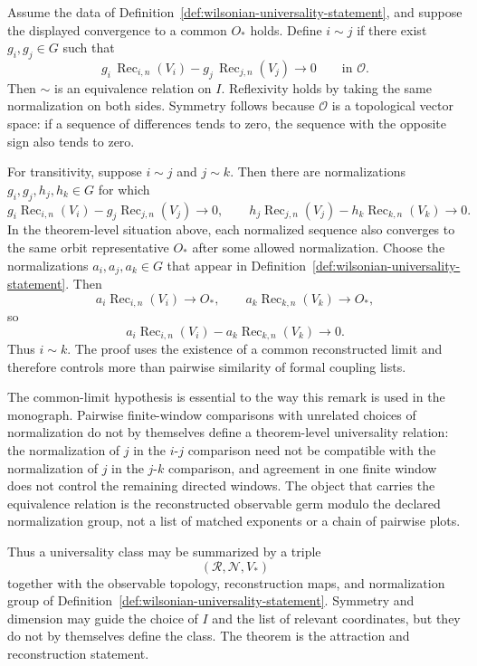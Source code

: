 \begin{remark}
\label{rem:universality-equivalence-relation}
Assume the data of Definition~\ref{def:wilsonian-universality-statement}, and
suppose the displayed convergence to a common \(O_\ast\) holds.  Define
\(i\sim j\) if there exist \(g_i,g_j\in G\) such that
\[
  g_i\,\operatorname{Rec}_{i,n}(V_i)
  -
  g_j\,\operatorname{Rec}_{j,n}(V_j)
  \longrightarrow0
  \qquad\text{in }\mathcal O .
\]
Then \(\sim\) is an equivalence relation on \(I\).
Reflexivity holds by taking the same normalization on both sides.  Symmetry
follows because \(\mathcal O\) is a topological vector space: if a sequence
of differences tends to zero, the sequence with the opposite sign also tends
to zero.

For transitivity, suppose \(i\sim j\) and \(j\sim k\).  Then there are
normalizations \(g_i,g_j,h_j,h_k\in G\) for which
\[
  g_i\operatorname{Rec}_{i,n}(V_i)
  -
  g_j\operatorname{Rec}_{j,n}(V_j)\to0,
  \qquad
  h_j\operatorname{Rec}_{j,n}(V_j)
  -
  h_k\operatorname{Rec}_{k,n}(V_k)\to0 .
\]
In the theorem-level situation above, each normalized sequence also converges
to the same orbit representative \(O_\ast\) after some allowed normalization.
Choose the normalizations \(a_i,a_j,a_k\in G\) that appear in
Definition~\ref{def:wilsonian-universality-statement}.  Then
\[
  a_i\operatorname{Rec}_{i,n}(V_i)\to O_\ast,
  \qquad
  a_k\operatorname{Rec}_{k,n}(V_k)\to O_\ast,
\]
so
\[
  a_i\operatorname{Rec}_{i,n}(V_i)
  -
  a_k\operatorname{Rec}_{k,n}(V_k)\to0 .
\]
Thus \(i\sim k\).  The proof uses the existence of a common reconstructed
limit and therefore controls more than pairwise similarity of formal coupling
lists.

The common-limit hypothesis is essential to the way this remark is used in
the monograph.  Pairwise finite-window comparisons with unrelated choices of
normalization do not by themselves define a theorem-level universality
relation: the normalization of \(j\) in the \(i\)-\(j\) comparison need not be
compatible with the normalization of \(j\) in the \(j\)-\(k\) comparison, and
agreement in one finite window does not control the remaining directed
windows.  The object that carries the equivalence relation is the
reconstructed observable germ modulo the declared normalization group, not a
list of matched exponents or a chain of pairwise plots.
\end{remark}

Thus a universality class may be summarized by a triple
\[
  (\mathcal R,\mathcal N,V_\ast)
\]
together with the observable topology, reconstruction maps, and normalization
group of Definition~\ref{def:wilsonian-universality-statement}.  Symmetry and
dimension may guide the choice of \(I\) and the list of relevant coordinates,
but they do not by themselves define the class.  The theorem is the attraction
and reconstruction statement.

